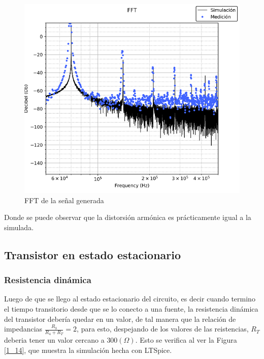 \begin{figure}[h]
\begin{centering}
\includegraphics[scale=0.7]{../Ex1/Resources/FFT}
\par\end{centering}
\caption{FFT de la señal generada}
\label{1_13}

\end{figure}

Donde se puede observar que la distorsión armónica es prácticamente
igual a la simulada.

\subsection{Transistor en estado estacionario}

\subsubsection{Resistencia dinámica}

Luego de que se llego al estado estacionario del circuito, es decir
cuando termino el tiempo transitorio desde que se lo conecto a una
fuente, la resistencia dinámica del transistor debería quedar en un
valor, de tal manera que la relación de impedancias $\frac{R_{3}}{R_{4}+R_{T}}=2$,
para esto, despejando de los valores de las reistencias, $R_{T}$
deberia tener un valor cercano a $300(\Omega)$. Esto se verifica
al ver la Figura \ref{1_14}, que muestra la simulación hecha con
LTSpice.

